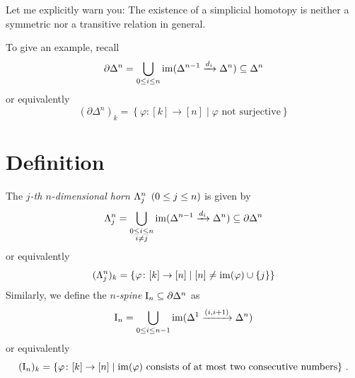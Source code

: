         Let me explicitly warn you: The existence of a simplicial homotopy is neither a symmetric nor a transitive relation in general.

        \smallskip

        To give an example, recall
        \begin{equation*}
            \partial \Delta^n = \bigcup_{0 \leq i \leq n} \operatorname{im} (\Delta^{n-1} \xrightarrow{d_i} \Delta^n) \subseteq \Delta^n
        \end{equation*}
        or equivalently
        \begin{equation*}
            (\partial \Delta^n)_k = \left\{ \varphi \colon [k] \to [n] \mid \varphi \text{ not surjective} \right\}
        \end{equation*}
    \section{Definition}
        The \emph{$j$-th $n$-dimensional horn} $\Lambda^{n}_{j} \enspace (0 \leq j \leq n)$ is given by
        \begin{equation*}
            \Lambda^{n}_{j} = \bigcup_{\substack{0 \leq i \leq n \\ i \neq j}} \operatorname{im} (\Delta^{n-1} \xrightarrow{d_i} \Delta^n) \subseteq \partial \Delta^n
        \end{equation*}
        or equivalently
        \begin{equation*}
            (\Lambda^{n}_{j})_k = \left\{ \varphi \colon [k] \to [n] \mid [n] \neq \operatorname{im}(\varphi) \cup \left\{ j \right\} \right\}
        \end{equation*}
        Similarly, we define the \emph{$n$-spine} $\mathrm{I}_n \subseteq \partial \Delta^n$ as
        \begin{equation*}
            \mathrm{I}_n = \bigcup_{0 \leq i \leq n - 1} \operatorname{im}(\Delta^1 \xrightarrow{(i, i + 1)} \Delta^n)
        \end{equation*}
        or equivalently
        \begin{equation*}
            (\mathrm{I}_n)_k = \left\{ \varphi \colon [k] \to [n] \mid \operatorname{im}(\varphi) \text{ consists of at most two consecutive numbers} \right\} \,.
        \end{equation*}
        \smallskip
        

